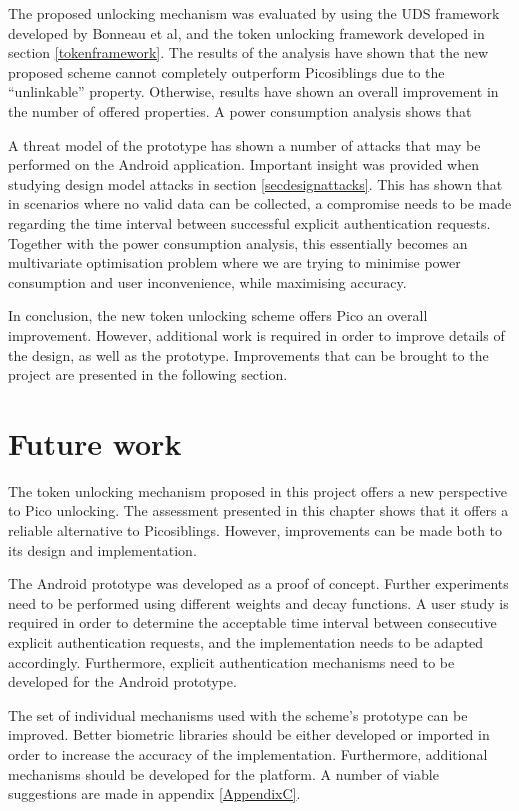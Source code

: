 The proposed unlocking mechanism was evaluated by using the UDS framework developed by Bonneau et al, and the token unlocking framework developed in section \ref{tokenframework}. The results of the analysis have shown that the new proposed scheme cannot completely outperform Picosiblings due to the ``unlinkable'' property. Otherwise, results have shown an overall improvement in the number of offered properties. A power consumption analysis shows that 

A threat model of the prototype has shown a number of attacks that may be performed on the Android application. Important insight was provided when studying design model attacks in section \ref{secdesignattacks}. This has shown that in scenarios where no valid data can be collected, a compromise needs to be made regarding the time interval between successful explicit authentication requests. Together with the power consumption analysis, this essentially becomes an multivariate optimisation problem where we are trying to minimise power consumption and user inconvenience, while maximising accuracy.

In conclusion, the new token unlocking scheme offers Pico an overall improvement. However, additional work is required in order to improve details of the design, as well as the prototype. Improvements that can be brought to the project are presented in the following section. 

\section*{Future work}
The token unlocking mechanism proposed in this project offers a new perspective to Pico unlocking. The assessment presented in this chapter shows that it offers a reliable alternative to Picosiblings. However, improvements can be made both to its design and implementation.

The Android prototype was developed as a proof of concept. Further experiments need to be performed using different weights and decay functions. A user study is required in order to determine the acceptable time interval between consecutive explicit authentication requests, and the implementation needs to be adapted accordingly. Furthermore, explicit authentication mechanisms need to be developed for the Android prototype.

The set of individual mechanisms used with the scheme's prototype can be improved. Better biometric libraries should be either developed or imported in order to increase the accuracy of the implementation. Furthermore, additional mechanisms should be developed for the platform. A number of viable suggestions are made in appendix \ref{AppendixC}.

